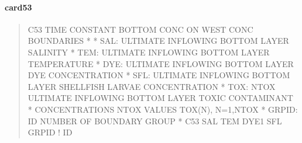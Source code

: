 \documentclass[letterpaper,10pt,english]{sphinxmanual}
\begin{document}
\paragraph{card53}
\label{\detokenize{inputfiles/runcontrol/card53:card53}}\label{\detokenize{inputfiles/runcontrol/card53::doc}}\begin{quote}

\begin{sphinxVerbatim}[commandchars=\\\{\}]
\PYGZhy{}\PYGZhy{}\PYGZhy{}\PYGZhy{}\PYGZhy{}\PYGZhy{}\PYGZhy{}\PYGZhy{}\PYGZhy{}\PYGZhy{}\PYGZhy{}\PYGZhy{}\PYGZhy{}\PYGZhy{}\PYGZhy{}\PYGZhy{}\PYGZhy{}\PYGZhy{}\PYGZhy{}\PYGZhy{}\PYGZhy{}\PYGZhy{}\PYGZhy{}\PYGZhy{}\PYGZhy{}\PYGZhy{}\PYGZhy{}\PYGZhy{}\PYGZhy{}\PYGZhy{}\PYGZhy{}\PYGZhy{}\PYGZhy{}\PYGZhy{}\PYGZhy{}\PYGZhy{}\PYGZhy{}\PYGZhy{}\PYGZhy{}\PYGZhy{}\PYGZhy{}\PYGZhy{}\PYGZhy{}\PYGZhy{}\PYGZhy{}\PYGZhy{}\PYGZhy{}\PYGZhy{}\PYGZhy{}\PYGZhy{}\PYGZhy{}\PYGZhy{}\PYGZhy{}\PYGZhy{}\PYGZhy{}\PYGZhy{}\PYGZhy{}\PYGZhy{}\PYGZhy{}\PYGZhy{}\PYGZhy{}\PYGZhy{}\PYGZhy{}\PYGZhy{}\PYGZhy{}\PYGZhy{}\PYGZhy{}\PYGZhy{}\PYGZhy{}\PYGZhy{}\PYGZhy{}\PYGZhy{}\PYGZhy{}\PYGZhy{}\PYGZhy{}\PYGZhy{}\PYGZhy{}\PYGZhy{}
C53 TIME CONSTANT BOTTOM CONC ON WEST CONC BOUNDARIES
*
*    SAL: ULTIMATE INFLOWING BOTTOM LAYER SALINITY
*    TEM: ULTIMATE INFLOWING BOTTOM LAYER TEMPERATURE
*    DYE: ULTIMATE INFLOWING BOTTOM LAYER DYE CONCENTRATION
*    SFL: ULTIMATE INFLOWING BOTTOM LAYER SHELLFISH LARVAE CONCENTRATION
*    TOX: NTOX ULTIMATE INFLOWING BOTTOM LAYER TOXIC CONTAMINANT
*         CONCENTRATIONS NTOX VALUES TOX(N), N=1,NTOX
*  GRPID: ID NUMBER OF BOUNDARY GROUP
*
C53       SAL       TEM      DYE1       SFL      GRPID ! ID
\end{sphinxVerbatim}
\end{quote}
\end{document}
